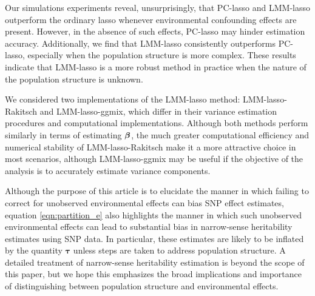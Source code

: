 Our simulations experiments reveal, unsurprisingly, that PC-lasso and LMM-lasso outperform the ordinary lasso whenever environmental confounding effects are present. However, in the absence of such effects, PC-lasso may hinder estimation accuracy. Additionally, we find that LMM-lasso consistently outperforms PC-lasso, especially when the population structure is more complex. These results indicate that LMM-lasso is a more robust method in practice when the nature of the population structure is unknown.

We considered two implementations of the LMM-lasso method: LMM-lasso-Rakitsch and LMM-lasso-ggmix, which differ in their variance estimation procedures and computational implementations. Although both methods perform similarly in terms of estimating $\boldsymbol{\beta}{}$, the much greater computational efficiency and numerical stability of LMM-lasso-Rakitsch make it a more attractive choice in most scenarios, although LMM-lasso-ggmix may be useful if the objective of the analysis is to accurately estimate variance components.

Although the purpose of this article is to elucidate the manner in which failing to correct for unobserved environmental effects can bias SNP effect estimates, equation \eqref{eqn:partition_e} also highlights the manner in which such unobserved environmental effects can lead to substantial bias in narrow-sense heritability estimates using SNP data. In particular, these estimates are likely to be inflated by the quantity $\boldsymbol{\tau}$ unless steps are taken to address population structure. A detailed treatment of narrow-sense heritability estimation is beyond the scope of this paper, but we hope this emphasizes the broad implications and importance of distinguishing between population structure and environmental effects.



